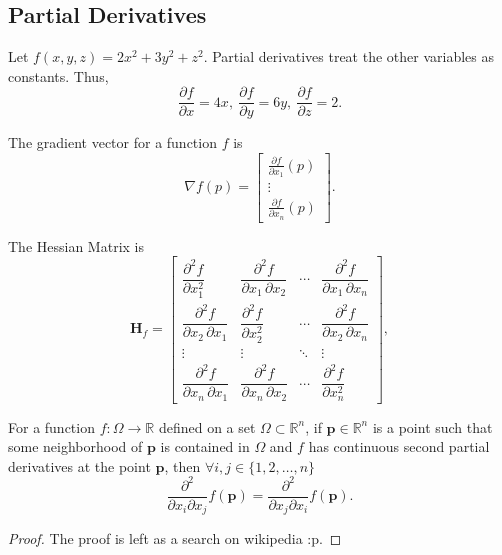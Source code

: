 \documentclass[11pt,twoside=semi,openright,numbers=noenddot]{scrbook}
\begin{document}
\subsection{Partial Derivatives}
Let $f(x,y,z) = 2x^2+3y^2+z^2$. Partial derivatives treat the other variables as constants.
Thus, $$\frac{\partial f}{\partial x} = 4x, ~ \frac{\partial f}{\partial y} = 6y, ~ \frac{\partial f}{\partial z} = 2.$$
\begin{definition}
The \alert{gradient vector} for a function $f$ is $${\displaystyle \nabla f(p)={\begin{bmatrix}{\frac {\partial f}{\partial x_{1}}}(p)\\\vdots \\{\frac {\partial f}{\partial x_{n}}}(p)\end{bmatrix}}.}$$
\end{definition}
\begin{definition}
The \alert{Hessian Matrix} is 
$${\displaystyle \mathbf {H} _{f}={\begin{bmatrix}{\dfrac {\partial ^{2}f}{\partial x_{1}^{2}}}&{\dfrac {\partial ^{2}f}{\partial x_{1}\,\partial x_{2}}}&\cdots &{\dfrac {\partial ^{2}f}{\partial x_{1}\,\partial x_{n}}}\\[2.2ex]{\dfrac {\partial ^{2}f}{\partial x_{2}\,\partial x_{1}}}&{\dfrac {\partial ^{2}f}{\partial x_{2}^{2}}}&\cdots &{\dfrac {\partial ^{2}f}{\partial x_{2}\,\partial x_{n}}}\\[2.2ex]\vdots &\vdots &\ddots &\vdots \\[2.2ex]{\dfrac {\partial ^{2}f}{\partial x_{n}\,\partial x_{1}}}&{\dfrac {\partial ^{2}f}{\partial x_{n}\,\partial x_{2}}}&\cdots &{\dfrac {\partial ^{2}f}{\partial x_{n}^{2}}}\end{bmatrix}},}$$
\end{definition}

\begin{theorem}
    For a function $f:\Omega \rightarrow \mathbb{R}$ defined on a set $\Omega \subset \mathbb{R}^n$, if $\mathbf{p} \in
    \mathbb{R}^n$ is a point such that some neighborhood of $\mathbf{p}$ is contained in $\Omega$ and $f$ has continuous
    second partial derivatives at the point $\mathbf{p}$, then $\forall i,j \in \{1,2,\dots,n\}$
    $$\frac{\partial^2}{\partial x_i \partial x_j}f(\mathbf{p})=\frac{\partial^2}{\partial x_j\partial x_i}f(\mathbf{p}).$$
\end{theorem}
\begin{proof}
    The proof is left as a search on wikipedia :p.
\end{proof}
\end{document}
